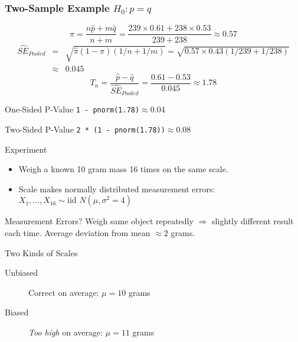\documentclass{beamer}
\begin{document}
\begin{frame}
	\frametitle{Two-Sample Example $H_0\colon p = q$}
	\small
$$\widehat{\pi} = \frac{n\widehat{p}+ m\widehat{q}}{n + m} = \frac{239 \times 0.61 + 238 \times 0.53}{239 + 238}\approx 0.57$$
	\begin{eqnarray*}
	\widehat{SE}_{Pooled} &=&  \sqrt{\widehat{\pi}(1-\widehat{\pi})\left( 1/n + 1/m \right) }= \sqrt{0.57 \times 0.43 (1/239 + 1/238)}\\
		&\approx& 0.045
	\end{eqnarray*}
$$T_n = \frac{\widehat{p} - \widehat{q}}{\widehat{SE}_{Pooled}}= \frac{0.61 - 0.53}{0.045} \approx 1.78$$
\begin{block}
	{One-Sided P-Value}
	\texttt{1 - pnorm(1.78)}$\approx 0.04$
\end{block}\begin{block}
	{Two-Sided P-Value}
	\texttt{2 * (1 - pnorm(1.78))}$\approx 0.08$
\end{block}
\end{frame}

\begin{frame}
\begin{block}
	{Experiment}
	\begin{itemize}
		\item Weigh a known 10 gram mass 16 times on the same scale.
		\item Scale makes normally distributed measurement errors:
		$X_1, \hdots, X_{16} \sim \mbox{iid } N( \mu, \sigma^2 = 4)$
	\end{itemize}
\end{block}
\begin{alertblock}
			{Measurement Errors?}
		 Weigh same object repeatedly $\Rightarrow$ slightly different result each time. Average deviation from mean $\approx 2$ grams.
		\end{alertblock}
\begin{block}{Two Kinds of Scales}
	\begin{description}
			\item[Unbiased] Correct on average: $\mu = 10$ grams
			\item[Biased] \emph{Too high} on average: $\mu = 11$ grams
		\end{description}	
		
\end{block}

\end{frame}
\end{document}

